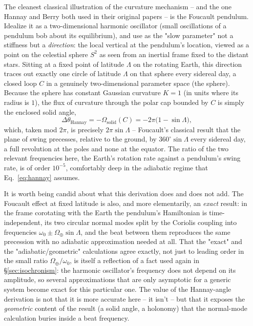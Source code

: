 \documentclass[11pt]{book}
\begin{document}
The cleanest classical illustration of the curvature mechanism -- and the one Hannay and Berry both
used in their original papers -- is the Foucault pendulum. Idealize it as a two-dimensional
harmonic oscillator (small oscillations of a pendulum bob about its equilibrium), and use as the
"slow parameter" not a stiffness but a \emph{direction}: the local vertical at the pendulum's
location, viewed as a point on the celestial sphere $S^2$ as seen from an inertial frame fixed to
the distant stars. Sitting at a fixed point of latitude $\Lambda$ on the rotating Earth, this
direction traces out exactly one circle of latitude $\Lambda$ on that sphere every sidereal day, a
closed loop $C$ in a genuinely two-dimensional parameter space (the sphere). Because the sphere has
constant Gaussian curvature $K=1$ (in units where its radius is $1$), the flux of curvature through
the polar cap bounded by $C$ is simply the enclosed solid angle,
\begin{equation}
\Delta\theta_{\text{Hannay}} = -\Omega_{\text{solid}}(C) = -2\pi\big(1-\sin\Lambda\big),
\end{equation}
which, taken mod $2\pi$, is precisely $2\pi\sin\Lambda$ -- Foucault's classical result that the
plane of swing precesses, relative to the ground, by $360^\circ\sin\Lambda$ every sidereal day, a
full revolution at the poles and none at the equator. The ratio of the two relevant frequencies
here, the Earth's rotation rate against a pendulum's swing rate, is of order $10^{-5}$, comfortably
deep in the adiabatic regime that Eq.~\eqref{eq:hannay} assumes.

It is worth being candid about what this derivation does and does not add. The Foucault effect at
fixed latitude is also, and more elementarily, an \emph{exact} result: in the frame corotating with
the Earth the pendulum's Hamiltonian is time-independent, its two circular normal modes split by
the Coriolis coupling into frequencies $\omega_0 \pm \Omega_{\oplus}\sin\Lambda$, and the beat
between them reproduces the same precession with no adiabatic approximation needed at all. That the
"exact" and the "adiabatic/geometric" calculations agree exactly, not just to leading order in the
small ratio $\Omega_\oplus/\omega_0$, is itself a reflection of a fact used again in
\S\ref{sec:isochronism}: the harmonic oscillator's frequency does not depend on its amplitude, so
several approximations that are only asymptotic for a generic system become exact for this
particular one. The value of the Hannay-angle derivation is not that it is more accurate here --
it isn't -- but that it exposes the \emph{geometric} content of the result (a solid angle, a
holonomy) that the normal-mode calculation buries inside a beat frequency.
\end{document}
